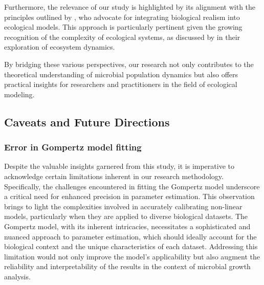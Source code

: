\documentclass[11pt]{article}
\begin{document}
\hfill\break
Furthermore, the relevance of our study is highlighted by its alignment with the principles outlined by \cite{Graeme}, who advocate for integrating biological realism into ecological models. This approach is particularly pertinent given the growing recognition of the complexity of ecological systems, as discussed by \cite{Michael} in their exploration of ecosystem dynamics.

\hfill\break
By bridging these various perspectives, our research not only contributes to the theoretical understanding of microbial population dynamics but also offers practical insights for researchers and practitioners in the field of ecological modeling.

\subsection{Caveats and Future Directions}
\subsubsection{Error in Gompertz model fitting}
Despite the valuable insights garnered from this study, it is imperative to acknowledge certain limitations inherent in our research methodology. Specifically, the challenges encountered in fitting the Gompertz model underscore a critical need for enhanced precision in parameter estimation. This observation brings to light the complexities involved in accurately calibrating non-linear models, particularly when they are applied to diverse biological datasets. The Gompertz model, with its inherent intricacies, necessitates a sophisticated and nuanced approach to parameter estimation, which should ideally account for the biological context and the unique characteristics of each dataset. Addressing this limitation would not only improve the model's applicability but also augment the reliability and interpretability of the results in the context of microbial growth analysis. 
\end{document}

